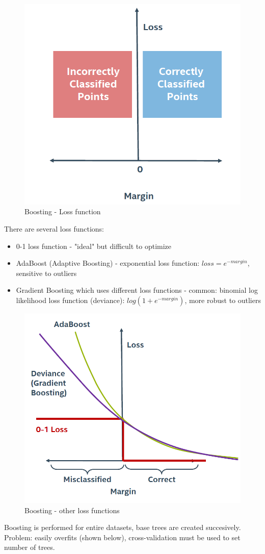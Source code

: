 \documentclass[11pt]{book}
\begin{document}
\begin{figure}[H]
    \centering
    \includegraphics[width=0.5\linewidth]{boost3.PNG}
    \caption{Boosting - Loss function}
    \label{fig:my_label}
\end{figure}

There are several loss functions:
\begin{itemize}
    \item 0-1 loss function - "ideal" but difficult to optimize
    \item AdaBoost (Adaptive Boosting) - exponential loss function: $loss = e^{-margin}$, sensitive to outliers
    \item Gradient Boosting which uses different loss functions - common: binomial log likelihood loss function (deviance): $log(1+e^{-margin})$, more robust to outliers
\end{itemize}

\begin{figure}[H]
    \centering
    \includegraphics[width=0.5\linewidth]{boost4.PNG}
    \caption{Boosting - other loss functions}
    \label{fig:my_label}
\end{figure}

Boosting is performed for entire datasets, base trees are created succesively. Problem: easily overfits (shown below), cross-validation must be used to set number of trees.
\end{document}
